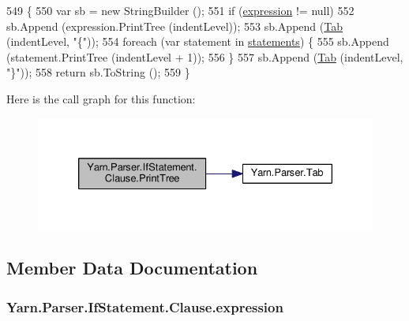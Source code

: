 \begin{DoxyCode}
549                                                            \{
550                     var sb = \textcolor{keyword}{new} StringBuilder ();
551                     \textcolor{keywordflow}{if} (\hyperlink{a00040_a1abd1f7c41f68ccdf64074ea49365be9}{expression} != null)
552                         sb.Append (expression.PrintTree (indentLevel));
553                     sb.Append (\hyperlink{a00139_aa8fa36b46de12a1c561d77b99c4b9ae3}{Tab} (indentLevel, \textcolor{stringliteral}{"\{"}));
554                     \textcolor{keywordflow}{foreach} (var statement \textcolor{keywordflow}{in} \hyperlink{a00040_a6f4765482e98ed042e38a0ede13f171f}{statements}) \{
555                         sb.Append (statement.PrintTree (indentLevel + 1));
556                     \}
557                     sb.Append (\hyperlink{a00139_aa8fa36b46de12a1c561d77b99c4b9ae3}{Tab} (indentLevel, \textcolor{stringliteral}{"\}"}));
558                     \textcolor{keywordflow}{return} sb.ToString ();
559                 \}
\end{DoxyCode}


Here is the call graph for this function\-:
\nopagebreak
\begin{figure}[H]
\begin{center}
\leavevmode
\includegraphics[width=330pt]{a00040_a7f4fc9399896512b68fdc7bc7cf818c9_cgraph}
\end{center}
\end{figure}




\subsection{Member Data Documentation}
\hypertarget{a00040_a1abd1f7c41f68ccdf64074ea49365be9}{
\subsubsection[{expression}]{ Yarn.\-Parser.\-If\-Statement.\-Clause.\-expression\hspace{0.3cm}{\ttfamily [package]}}}\label{a00040_a1abd1f7c41f68ccdf64074ea49365be9}


